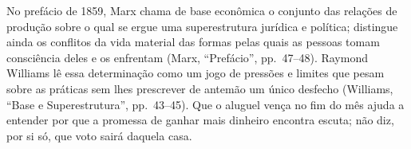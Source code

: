 No prefácio de 1859, Marx chama de base econômica o conjunto das relações de produção sobre o qual se ergue uma superestrutura jurídica e política; distingue ainda os conflitos da vida material das formas pelas quais as pessoas tomam consciência deles e os enfrentam (Marx, “Prefácio”, pp.~47--48).
Raymond Williams lê essa determinação como um jogo de pressões e limites que pesam sobre as práticas sem lhes prescrever de antemão um único desfecho (Williams, “Base e Superestrutura”, pp.~43--45).
Que o aluguel vença no fim do mês ajuda a entender por que a promessa de ganhar mais dinheiro encontra escuta; não diz, por si só, que voto sairá daquela casa.
